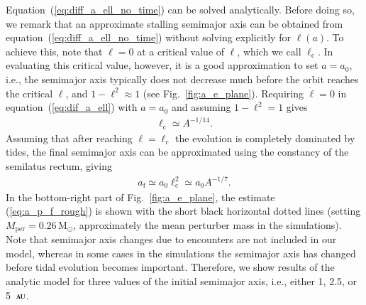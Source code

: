 \documentclass[iop,usenatbib]{emulateapj}
\newcommand{\au}{\,\textsc{au}}
\newcommand{\mper}{M_\mathrm{per}}
\begin{document}
Equation~(\ref{eq:diff_a_ell_no_time}) can be solved analytically. Before doing so, we remark that an approximate stalling semimajor axis can be obtained from equation~(\ref{eq:diff_a_ell_no_time}) without solving explicitly for $\ell(a)$. To achieve this, note that $\dot{\ell} = 0$ at a critical value of $\ell$, which we call $\ell_{\mathrm{c}}$. In evaluating this critical value, however, it is a good approximation to set $a = a_{0}$, i.e., the semimajor axis typically does not decrease much before the orbit reaches the critical $\ell$, and $1-\ell^2 \approx 1$ (see Fig.~\ref{fig:a_e_plane}). Requiring $\dot{\ell}=0$ in equation~(\ref{eq:dif_a_ell}) with $a = a_{0}$ and assuming $1-\ell^2 = 1$ gives
\begin{align}
\ell_{\mathrm{c}} \simeq A^{-1/14}.
\end{align}
Assuming that after reaching $\ell = \ell_{\mathrm{c}}$ the evolution is completely dominated by tides, the final semimajor axis can be approximated using the constancy of the semilatus rectum, giving
\begin{align}
\label{eq:a_p_f_rough}
a_{\mathrm{f}} \simeq a_{0} \ell_{\mathrm{c}}^2 \simeq a_{0} A^{-1/7}.
\end{align}
In the bottom-right part  of Fig.~\ref{fig:a_e_plane}, the estimate (\ref{eq:a_p_f_rough}) is shown with the short black horizontal dotted lines (setting $\mper = 0.26 \, \mathrm{M}_\odot$, approximately the mean perturber mass in the simulations). Note that semimajor axis changes due to encounters are not included in our model, whereas in some cases in the simulations the semimajor axis has changed before tidal evolution becomes important. Therefore, we show results of the analytic model for three values of the initial semimajor axis, i.e., either 1, 2.5, or 5 $\au$. 
\end{document}
